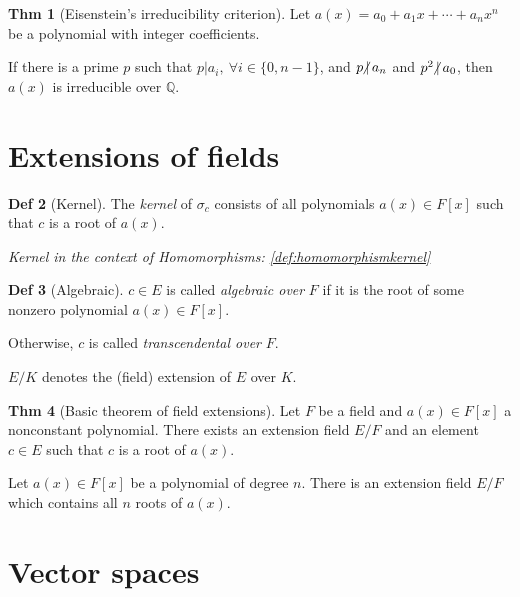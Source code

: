 \documentclass{article}
\theoremstyle{definition}
\newtheorem{definition}{Def}[section]
\newtheorem{theorem}[definition]{Thm}
\newcommand{\ndiv}{\hspace{-4pt}\not|\hspace{2pt}}
\begin{document}
\begin{theorem}[Eisenstein's irreducibility criterion]
    Let $a(x) = a_0 + a_1 x + \cdots + a_n x^n$ be a polynomial with integer coefficients.

    If there is a prime $p$ such that $p | a_i, ~\forall i\in\{0, n-1\}$, and $p \ndiv a_n$ and $p^2 \ndiv a_0$, then $a(x)$ is irreducible over $\mathbb{Q}$.
\end{theorem}

\section{Extensions of fields}

\begin{definition}[Kernel]\label{def:extensionkernel}
    The \emph{kernel} of $\sigma_c$ consists of all polynomials $a(x) \in F[x]$ such that $c$ is a root of $a(x)$.

    \emph{Kernel in the context of Homomorphisms: \ref{def:homomorphismkernel}}
\end{definition}

\begin{definition}[Algebraic]
    $c \in E$ is called \emph{algebraic over} $F$ if it is the root of some nonzero polynomial $a(x) \in F[x]$.

    Otherwise, $c$ is called \emph{transcendental over} $F$.
\end{definition}

$E/K$ denotes the (field) extension of $E$ over $K$.

\begin{theorem}[Basic theorem of field extensions]
    Let $F$ be a field and $a(x) \in F[x]$ a nonconstant polynomial. There exists an extension field $E/F$ and an element $c \in E$ such that $c$ is a root of $a(x)$.
\end{theorem}

Let $a(x) \in F[x]$ be a polynomial of degree $n$. There is an extension field $E/F$ which contains all $n$ roots of $a(x)$.

\section{Vector spaces}
\end{document}
